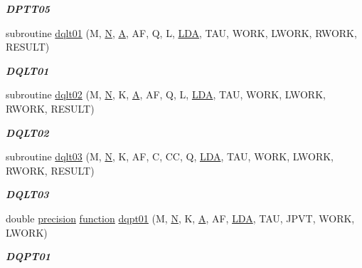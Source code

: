 \begin{DoxyCompactItemize}
\begin{DoxyCompactList}\small\item\em {\bfseries D\+P\+T\+T05} \end{DoxyCompactList}\item 
subroutine \hyperlink{group__double__lin_ga17d7e42c8830ebf5b0e0d91a9d778fd2}{dqlt01} (M, \hyperlink{polmisc_8c_a0240ac851181b84ac374872dc5434ee4}{N}, \hyperlink{classA}{A}, A\+F, Q, L, \hyperlink{example__user_8c_ae946da542ce0db94dced19b2ecefd1aa}{L\+D\+A}, T\+A\+U, W\+O\+R\+K, L\+W\+O\+R\+K, R\+W\+O\+R\+K, R\+E\+S\+U\+L\+T)
\begin{DoxyCompactList}\small\item\em {\bfseries D\+Q\+L\+T01} \end{DoxyCompactList}\item 
subroutine \hyperlink{group__double__lin_ga7e213f6864d378b023433585b255b231}{dqlt02} (M, \hyperlink{polmisc_8c_a0240ac851181b84ac374872dc5434ee4}{N}, K, \hyperlink{classA}{A}, A\+F, Q, L, \hyperlink{example__user_8c_ae946da542ce0db94dced19b2ecefd1aa}{L\+D\+A}, T\+A\+U, W\+O\+R\+K, L\+W\+O\+R\+K, R\+W\+O\+R\+K, R\+E\+S\+U\+L\+T)
\begin{DoxyCompactList}\small\item\em {\bfseries D\+Q\+L\+T02} \end{DoxyCompactList}\item 
subroutine \hyperlink{group__double__lin_gac5611c6cf2590a403dba28987e3d943d}{dqlt03} (M, \hyperlink{polmisc_8c_a0240ac851181b84ac374872dc5434ee4}{N}, K, A\+F, C, C\+C, Q, \hyperlink{example__user_8c_ae946da542ce0db94dced19b2ecefd1aa}{L\+D\+A}, T\+A\+U, W\+O\+R\+K, L\+W\+O\+R\+K, R\+W\+O\+R\+K, R\+E\+S\+U\+L\+T)
\begin{DoxyCompactList}\small\item\em {\bfseries D\+Q\+L\+T03} \end{DoxyCompactList}\item 
double \hyperlink{numinquire_8h_a2c8e616467665d0b2814d4c1589ba74e}{precision} \hyperlink{afunc_8m_a7b5e596df91eadea6c537c0825e894a7}{function} \hyperlink{group__double__lin_ga22be349893f9397ea12efa368fa75407}{dqpt01} (M, \hyperlink{polmisc_8c_a0240ac851181b84ac374872dc5434ee4}{N}, K, \hyperlink{classA}{A}, A\+F, \hyperlink{example__user_8c_ae946da542ce0db94dced19b2ecefd1aa}{L\+D\+A}, T\+A\+U, J\+P\+V\+T, W\+O\+R\+K, L\+W\+O\+R\+K)
\begin{DoxyCompactList}\small\item\em {\bfseries D\+Q\+P\+T01} \end{DoxyCompactList}\item 

\end{DoxyCompactItemize}
